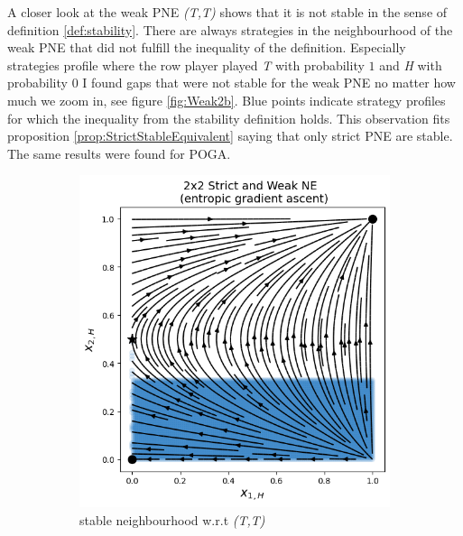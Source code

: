 A closer look at the weak PNE \textit{(T,T)} shows that it is not stable in the sense of definition \ref{def:stability}. There are always strategies in the neighbourhood of the weak PNE that did not fulfill the inequality of the definition. Especially strategies profile where the row player played \textit{T} with probability $1$ and \textit{H} with probability $0$ I found gaps that were not stable for the weak PNE no matter how much we zoom in, see figure \ref{fig:Weak2b}. Blue points indicate strategy profiles for which the inequality from the stability definition holds. This observation fits proposition \ref{prop:StrictStableEquivalent} saying that only strict PNE are stable. The same results were found for POGA. \\

\begin{figure}[H]
\captionsetup{justification=centering}
\centering
\begin{subfigure}{.48\textwidth}
    \centering
    \includegraphics[width=\textwidth]{logos/Weak3.png}
    \caption{stable neighbourhood w.r.t \textit{(T,T)}}
    \label{fig:Weak2a}
\end{subfigure}%
\begin{subfigure}{.52\textwidth}
    \centering

\end{subfigure}
\end{figure}
